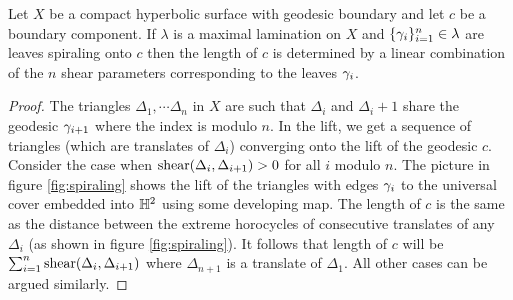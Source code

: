 \begin{proposition}
  Let $X$ be a compact hyperbolic surface with geodesic boundary and let $c$ be a boundary component. If $\lambda$ is a maximal lamination on $X$ and $\{\gamma_i\}_{i=1}^n\in \lambda$ are leaves spiraling onto $c$ then the length of $c$ is determined by a linear combination of the $n$ shear parameters corresponding to the leaves $\gamma_i$.  
\end{proposition}
\begin{proof}
  The triangles $\Delta_1,\cdots \Delta_n$ in $X$ are such that $\Delta_i$ and $\Delta_i+1$ share the geodesic $\gamma_{i+1}$ where the index is modulo $n$. In the lift, we get a sequence of triangles (which are translates of $\Delta_i$) converging onto the lift of the geodesic $c$. Consider the case when $\text{shear}(\Delta_i,\Delta_{i+1})>0$ for all $i$ modulo $n$. The picture in figure \ref{fig:spiraling} shows the lift of the triangles with edges $\gamma_i$ to the universal cover embedded into $\mathbb{H}^2$ using some developing map. The length of $c$ is the same as the distance between the extreme horocycles of consecutive translates of any $\Delta_i$ (as shown in figure \ref{fig:spiraling}). It follows that length of $c$ will be $\sum_{i=1}^n \text{shear}(\Delta_i, \Delta_{i+1})$ where $\Delta_{n+1}$ is a translate of $\Delta_1$. All other cases can be argued similarly.
\end{proof}

